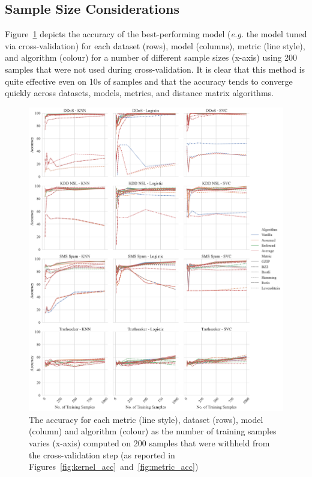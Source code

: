 \documentclass[preprint,12pt]{elsarticle}
\begin{document}
\subsection{Sample Size Considerations}
Figure~\ref{fig:sample_size} depicts the accuracy of the best-performing model (\textit{e.g.} the model tuned via cross-validation) for each dataset (rows), model (columns), metric (line style), and algorithm (colour) for a number of different sample sizes (x-axis) using 200 samples that were not used during cross-validation. 
It is clear that this method is quite effective even on 10s of samples and that the accuracy tends to converge quickly across datasets, models, metrics, and distance matrix algorithms. 
\begin{figure}
    \centering
    \includegraphics[width=\textwidth]{images/accuracy_vs_train_size.pdf}
    \caption{The accuracy for each metric (line style), dataset (rows), model (column) and algorithm (colour) as the number of training samples varies (x-axis) computed on 200 samples that were withheld from the cross-validation step (as reported in Figures~\ref{fig:kernel_acc}~and~\ref{fig:metric_acc})}
    \label{fig:sample_size}
\end{figure}
\end{document}
